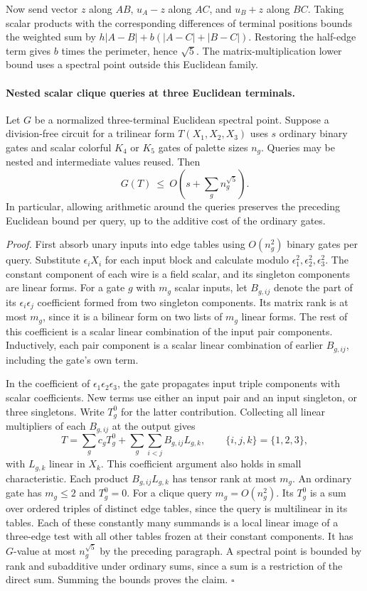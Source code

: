\documentclass[11pt,letterpaper]{article}
\begin{document}
Now send vector \(z\) along \(AB\), \(u_A-z\) along \(AC\), and \(u_B+z\)
along \(BC\). Taking scalar products with the corresponding differences
of terminal positions bounds the weighted sum by
\(h|A-B|+b(|A-C|+|B-C|)\).
Restoring the half-edge term gives \(b\) times the perimeter, hence
\(\sqrt5\). The matrix-multiplication lower bound uses a spectral point
outside this Euclidean family.

\paragraph{Nested scalar clique queries at three Euclidean terminals.}
Let \(G\) be a normalized three-terminal Euclidean spectral point. Suppose a
division-free circuit for a trilinear form \(T(X_1,X_2,X_3)\) uses \(s\) ordinary
binary gates and scalar colorful \(K_4\) or \(K_5\) gates of palette sizes
\(n_g\). Queries may be nested and intermediate values reused. Then
\[
                     G(T)\ \le\ O\left(s+\sum_g n_g^{\sqrt5}\right).
\]
In particular, allowing arithmetic around the queries preserves the preceding
Euclidean bound per query, up to the additive cost of the ordinary gates.

\emph{Proof.} First absorb unary inputs into edge tables using \(O(n_g^2)\)
binary gates per query. Substitute \(\epsilon_i X_i\) for each input block and
calculate modulo \(\epsilon_1^2,\epsilon_2^2,\epsilon_3^2\). The constant
component of each wire is a field scalar, and its singleton components are
linear forms. For a gate \(g\) with \(m_g\) scalar inputs, let \(B_{g,ij}\)
denote the part of its \(\epsilon_i\epsilon_j\) coefficient formed from two
singleton components. Its matrix rank is at most \(m_g\), since it is a
bilinear form on two lists of \(m_g\) linear forms. The rest of this
coefficient is a scalar linear combination of the input pair components.
Inductively, each pair component is a scalar linear combination of earlier
\(B_{g,ij}\), including the gate's own term.

In the coefficient of \(\epsilon_1\epsilon_2\epsilon_3\), the gate propagates
input triple components with scalar coefficients. New terms use either an
input pair and an input singleton, or three singletons. Write \(T_g^0\) for
the latter contribution. Collecting all linear multipliers of each
\(B_{g,ij}\) at the output gives
\[
 T=\sum_g c_gT_g^0+
   \sum_g\sum_{i<j} B_{g,ij} L_{g,k},\qquad \{i,j,k\}=\{1,2,3\},
\]
with \(L_{g,k}\) linear in \(X_k\). This coefficient argument also holds in
small characteristic. Each product \(B_{g,ij}L_{g,k}\) has tensor rank at
most \(m_g\). An ordinary gate has \(m_g\le2\) and \(T_g^0=0\).
For a clique query \(m_g=O(n_g^2)\). Its \(T_g^0\) is a sum over ordered
triples of distinct edge tables, since the query is multilinear in its
tables. Each of these constantly many summands is a local linear image of
a three-edge test with all other tables frozen at their constant components.
It has \(G\)-value at most \(n_g^{\sqrt5}\) by the preceding paragraph.
A spectral point is bounded by rank and subadditive under ordinary sums,
since a sum is a restriction of the direct sum. Summing the bounds proves
the claim. \hfill\(\square\)
\end{document}
